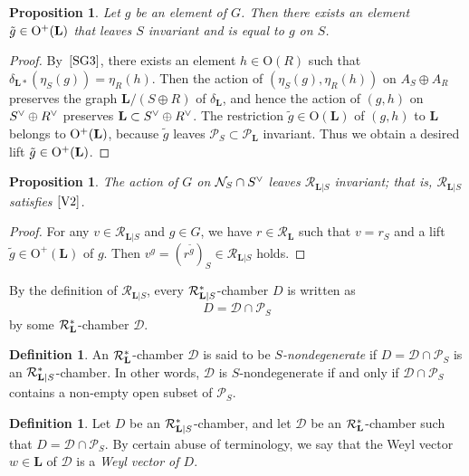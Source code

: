 \documentclass{amsart}
\theoremstyle{plain}
\newtheorem{proposition}[theorem]{Proposition}
\theoremstyle{definition}
\newtheorem{definition}[theorem]{Definition}
\theoremstyle{remark}
\numberwithin{equation}{section}
\numberwithin{table}{section}
\numberwithin{figure}{section}
\newcommand{\DDD}{\mathord{\mathcal D}}
\newcommand{\NNN}{\mathord{\mathcal N}}
\newcommand{\PPP}{\mathord{\mathcal P}}
\newcommand{\RRR}{\mathord{\mathcal R}}
\newcommand{\dual}{\sp{\vee}}
\newcommand{\OG}{\mathord{\mathrm {O}}}
\renewcommand{\L}{\mathord{\mathbf{L}}}
\newcommand{\Roots}{\RRR}
\newcommand{\sphyp}{\sp*}
\newcommand{\RtsLS}{\Roots_{\L|S}}
\newcommand{\propVtwo}{\mathord{\rm [V2]}}
\newcommand{\assumpthree}{\mathord{\rm [SG3]}}
\begin{document}
%
\begin{proposition}\label{prop:liftg}
Let $g$ be an element of $G$.
Then there exists an element  $\tilde {g}\in \OG\sp+({\L})$
that leaves $S$ invariant and is equal to $g$ on $S$.
\end{proposition}
%
\begin{proof}
By~$\assumpthree$,
there exists an element $h\in \OG(R)$ such that $\delta_{\L*}(\eta_S(g))=\eta_R(h)$.
Then the action of $(\eta_S(g), \eta_R(h))$ on $A_S\oplus A_R$ preserves 
the graph ${\L}/(S\oplus R)$  of $\delta_{\L}$,
and hence the action of $(g, h)$ on $S\dual\oplus R\dual$ preserves 
 ${\L}\subset S\dual\oplus R\dual$.
The restriction $\tilde {g}\in \OG({\L})$  of $(g, h)$ to ${\L}$
belongs to  $\OG\sp+({\L})$,
because $\tilde{g}$ leaves  $\PPP_S\subset \PPP_{\L}$ invariant.
Thus we obtain  a desired lift $\tilde {g}\in \OG\sp+({\L})$. 
\end{proof}
%
\begin{proposition}
The action of $G$ on $\NNN_S\cap S\dual$ leaves 
$\RtsLS$  invariant;  that is, 
$\RtsLS$ satisfies $\propVtwo$.
\end{proposition}
%
\begin{proof}
For any $v\in \RtsLS$ and $g\in G$,
we have $r\in \Roots_{\L}$ such that $v=r_S$
and a lift $\tilde {g}\in \OG^+({\L})$ of $g$.
Then  $v^g=(r^{\tilde g})_S\in \RtsLS$ holds.
\end{proof}
%
%
By the definition of $\RtsLS$, 
every $\RtsLS\sphyp$-chamber $D$ is written as 
$$
D=\DDD\cap\PPP_S
$$
by some $\Roots_{\L}\sphyp$-chamber $\DDD$.
%
\begin{definition}\label{def:Snondeg}
An $\Roots_{\L}\sphyp$-chamber $\DDD$
is said to be \emph{$S$-nondegenerate} if  $D=\DDD\cap\PPP_S$
is an $\RtsLS\sphyp$-chamber.
In other words,
$\DDD$
is $S$-nondegenerate
if and only if
$\DDD\cap\PPP_S$ contains a non-empty open subset of $\PPP_S$.
\end{definition}
%
%
\begin{definition}\label{def:Sweylvector}
Let $D$ be an $\RtsLS\sphyp$-chamber, 
and let $\DDD$ be an $\Roots_{\L}\sphyp$-chamber such that $D=\DDD\cap\PPP_S$.
By certain abuse of terminology,
we say that the Weyl vector $w\in {\L}$ of  $\DDD$ is 
a \emph{Weyl vector of $D$}.
\end{definition}
%
%
\end{document}
